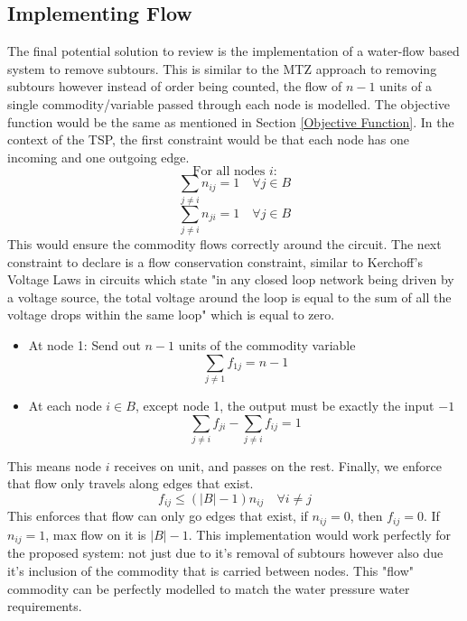 \subsection{Implementing Flow}\label{Implementing Flow}
The final potential solution to review is the implementation of a water-flow based system to remove subtours. This is similar to the MTZ approach to removing subtours however instead of order being counted, the flow of $n-1$ units of a single commodity/variable passed through each node is modelled. The objective function would be the same as mentioned in Section \ref{Objective Function}.\newline
In the context of the TSP, the first constraint would be that each node has one incoming and one outgoing edge.
\[
\text{For all nodes $i$:}
\]
\[
\sum_{j\neq i}n_{ij} = 1 \quad \forall j\in B
\]
\[
\sum_{j\neq i}n_{ji} = 1 \quad \forall j\in B
\]
This would ensure the commodity flows correctly around the circuit. The next constraint to declare is a flow conservation constraint, similar to Kerchoff's Voltage Laws in circuits which state "in any closed loop network being driven by a voltage source, the total voltage around the loop is equal to the sum of all the voltage drops within the same loop" which is equal to zero. \citep{alexander_2012_fundamentals}

\begin{itemize}
    \item At node 1: Send out $n-1$ units of the commodity variable
    \[
    \sum_{j \ne 1} f_{1j} = n - 1
    \]

    \item At each node $i \in B$, except node 1, the output must be exactly the input $- 1$
    \[
    \sum_{j \ne i} f_{ji} - \sum_{j \ne i} f_{ij} = 1
    \]
\end{itemize}
This means node $i$ receives on unit, and passes on the rest.
Finally, we enforce that flow only travels along edges that exist.
\[
f_{ij}\leq (|B|-1)n_{ij} \quad\forall i\neq j
\]
This enforces that flow can only go edges that exist, if $n_{ij} = 0$, then $f_{ij}=0$. If $n_{ij}=1$, max flow on it is $|B|-1$.
\newline\newline
This implementation would work perfectly for the proposed system: not just due to it's removal of subtours however also due it's inclusion of the commodity that is carried between nodes. This "flow" commodity can be perfectly modelled to match the water pressure water requirements.

